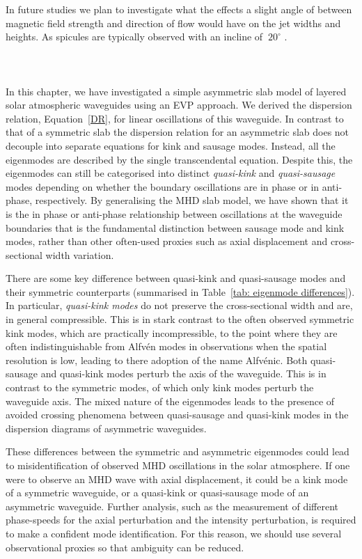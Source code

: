 \documentclass[12pt]{ociamthesis}
\newcommand{\np}{\\ \\}
\begin{document}
In future studies we plan to investigate what the effects a slight angle of between magnetic field strength and direction of flow would have on the jet widths and heights. As spicules are typically observed with an incline of $~20^{\circ}$ \citep{Tavabi2012JMPh31786T}.   \np \np
In this chapter, we have investigated a simple asymmetric slab model of layered solar atmospheric waveguides using an EVP approach. We derived the dispersion relation, Equation~\eqref{DR}, for linear oscillations of this waveguide. In contrast to that of a symmetric slab the dispersion relation for an asymmetric slab does not decouple into separate equations for kink and sausage modes. Instead, all the eigenmodes are described by the single transcendental equation. Despite this, the eigenmodes can still be categorised into distinct \textit{quasi-kink} and \textit{quasi-sausage} modes depending on whether the boundary oscillations are in phase or in anti-phase, respectively. By generalising the MHD slab model, we have shown that it is the in phase or anti-phase relationship between oscillations at the waveguide boundaries that is the fundamental distinction between sausage mode and kink modes, rather than other often-used proxies such as axial displacement and cross-sectional width variation.

There are some key difference between quasi-kink and quasi-sausage modes and their symmetric counterparts (summarised in Table~\ref{tab: eigenmode differences}). In particular, \textit{quasi-kink modes} do not preserve the cross-sectional width and are, in general compressible. This is in stark contrast to the often observed symmetric kink modes, which are practically incompressible, to the point where they are often indistinguishable from Alfv\'{e}n modes in observations when the spatial resolution is low, leading to there adoption of the name Alfv\'{e}nic. Both quasi-sausage and quasi-kink modes perturb the axis of the waveguide. This is in contrast to the symmetric modes, of which only kink modes perturb the waveguide axis. The mixed nature of the eigenmodes leads to the presence of avoided crossing phenomena between quasi-sausage and quasi-kink modes in the dispersion diagrams of asymmetric waveguides.

These differences between the symmetric and asymmetric eigenmodes could lead to misidentification of observed MHD oscillations in the solar atmosphere. If one were to observe an MHD wave with axial displacement, it could be a kink mode of a symmetric waveguide, or a quasi-kink or quasi-sausage mode of an asymmetric waveguide. Further analysis, such as the measurement of different phase-speeds for the axial perturbation and the intensity perturbation, is required to make a confident mode identification. For this reason, we should use several observational proxies so that ambiguity can be reduced.
\end{document}
